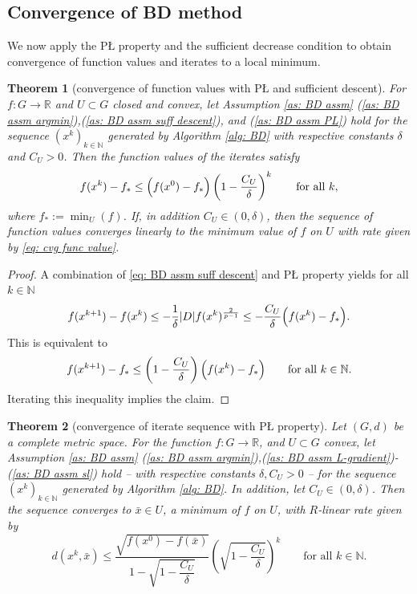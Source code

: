 \documentclass{article}
\theoremstyle{plain}\newtheorem{theorem}{Theorem}[section]
\theoremstyle{plain}\newtheorem{definition}[theorem]{Definition}
\theoremstyle{plain}\newtheorem{lemma}[theorem]{Lemma}
\theoremstyle{definition}\newtheorem{remark}[theorem]{Remark}
\theoremstyle{definition}\newtheorem{example}[theorem]{Example}
\theoremstyle{plain}\newtheorem{proposition}[theorem]{Proposition}
\theoremstyle{plain}\newtheorem{inference}[theorem]{Inference}
\theoremstyle{plain}\newtheorem{corollary}[theorem]{Corollary}
\theoremstyle{plain}\newtheorem{assumption}[theorem]{Assumption}
\newcommand{\xbar}{\bar{x}}
\newcommand{\bbN}{\mathbb{N}}
\newcommand{\Nbb}{\mathbb{N}}
\begin{document}
\subsection{Convergence of BD method}\label{s:convergence}
We now apply the PŁ property and the sufficient decrease condition to obtain convergence of function values and iterates to a local minimum.
\begin{theorem}[convergence of function values with PŁ and sufficient descent]\label{th: cvg func value}
    For $f:G\to\mathbb{R}$ and $U\subset G$ closed and convex, let Assumption \ref{as: BD assm} (\ref{as: BD assm argmin}),(\ref{as: BD assm suff descent}), and (\ref{as: BD assm PL}) hold for the sequence $(x^k)_{k\in\bbN}$ generated by Algorithm \ref{alg: BD} with respective constants $\delta$ and $C_U>0$. Then the function values of the iterates satisfy
    \begin{equation}\label{eq: cvg func value}
        f(x^k)-f_*\leq\Bigl(f(x^0)-f_*\Bigr)\left(1-\frac{C_U}{\delta}\right)^k \qquad\text{for all}\,\,k,
    \end{equation}
    where $f_*:=\min_U(f)$. If, in addition $C_U\in(0,\delta)$, then the sequence of function values converges linearly to the minimum value of $f$ on $U$ with rate given by \eqref{eq: cvg func value}.
\end{theorem}
\begin{proof}
    A combination of \eqref{eq: BD assm suff descent} and PŁ property yields for all $k\in\bbN$
    $$
    f(x^{k+1})-f(x^k)\leq-\frac{1}{\delta}|D|f(x^k)^{\frac{2}{p-1}}\leq-\frac{C_U}{\delta}\Bigl(f(x^k)-f_*\Bigr).
    $$
    This is equivalent to
    $$
    f(x^{k+1})-f_*\leq\left(1-\frac{C_U}{\delta}\right)\Bigl(f(x^k)-f_*\Bigr) \qquad\text{for all}\,\,k\in\bbN.
    $$
    Iterating this inequality implies the claim.
\end{proof}
\begin{theorem}[convergence of iterate sequence with PŁ property]\label{th: cvg ite}
    Let $(G,d)$ be a complete metric space. For the function $f:G\to\mathbb{R}$, and $U\subset G$ convex, let Assumption \ref{as: BD assm} (\ref{as: BD assm argmin}),(\ref{as: BD assm L-gradient})-(\ref{as: BD assm sl}) hold -- with respective constants $\delta, C_U>0$ -- for the sequence $(x^k)_{k\in\bbN}$ generated by Algorithm \ref{alg: BD}. In addition, let $C_U\in(0,\delta)$. Then the sequence converges to $\xbar\in U$, a minimum of $f$ on $U$, with $R$-linear rate given by
    \begin{equation}\label{eq: cvg ite}
        d(x^k,\xbar)\leq\frac{\sqrt{f(x^0)-f(\xbar)}}{1-\sqrt{1-\dfrac{C_U}{\delta}}}\left(\sqrt{1-\frac{C_U}{\delta}}\right)^{k} \qquad\text{for all}\,\,k\in\Nbb.
    \end{equation}
\end{theorem}
\end{document}
